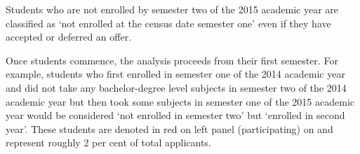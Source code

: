 Students who are not enrolled by semester two of the 2015 academic year are classified as `not enrolled at the census date semester one' even if they have accepted or deferred an offer.

Once students commence, the analysis proceeds from their first semester. For example, students who first enrolled in semester one of the 2014 academic year and did not take any bachelor-degree level subjects in semester two of the 2014 academic year but then took some subjects in semester one of the 2015 academic year would be considered `not enrolled in semester two' but `enrolled in second year'. These students are denoted in red on left panel (participating) on  and represent roughly 2 per cent of total applicants.


    
    

